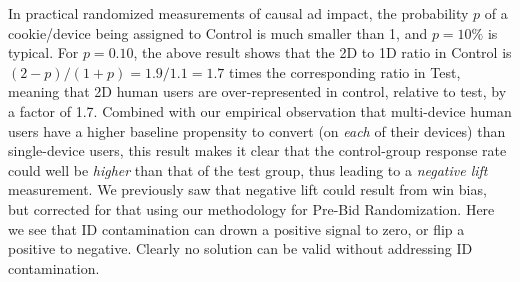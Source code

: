 \documentclass[11pt,a4paper]{article}
\theoremstyle{definition}
\theoremstyle{remark}
\theoremstyle{definition}
\theoremstyle{definition}
\theoremstyle{definition}
\theoremstyle{definition}
\theoremstyle{definition}
\theoremstyle{definition}
\begin{document}
In practical randomized measurements of causal ad impact, the probability $p$ of a cookie/device being assigned to Control is much smaller than 1, and $p = 10\%$ is typical. For $p = 0.10$, the above result shows that the 2D to 1D ratio in Control is $(2-p)/(1+p) = 1.9/1.1 = 1.7$ times the corresponding ratio in Test, meaning that 2D human users are over-represented in control, relative to test, by a factor of 1.7. Combined with our empirical observation that multi-device human users have a higher baseline propensity to convert (on \textit{each} of their devices) than single-device users, this result makes it clear that the control-group response rate could well be \textit{higher} than that of the test group, thus leading to a \textit{negative lift} measurement. We previously saw that negative lift could result from win bias, but corrected for that using our methodology for Pre-Bid Randomization. Here we see that ID contamination can drown a positive signal to zero, or flip a positive to  negative. Clearly no solution can be valid without addressing ID contamination.
\end{document}
